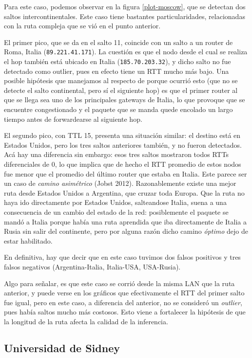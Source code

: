 Para este caso, podemos observar en la figura \ref{plot-moscow}, que se detectan dos saltos intercontinentales. Este caso tiene bastantes particularidades, relacionadas con la ruta compleja que se vió en el punto anterior. 

El primer pico, que se da en el salto 11, coincide con un salto a un router de Roma, Italia (\texttt{89.221.41.171}). La cuestión es que el nodo desde el cual se realiza el hop también está ubicado en Italia (\texttt{185.70.203.32}), y dicho salto no fue detectado como outlier, pues en efecto tiene un RTT mucho más bajo. Una posible hipótesis que manejamos al respecto de porque ocurrió esto (que no se detecte el salto continental, pero sí el siguiente hop) es que el primer router al que se llega sea uno de los principales gateways de Italia, lo que provoque que se encuentre congestionado y el paquete que se manda quede encolado un largo tiempo antes de forwardearse al siguiente hop. 

El segundo pico, con TTL 15, presenta una situación similar: el destino está en Estados Unidos, pero los tres saltos anteriores también, y no fueron detectados. Acá hay una diferencia sin embargo: esos tres saltos mostraron todos RTTs diferenciales de 0, lo que implica que de hecho el RTT promedio de estos nodos fue menor que el promedio del último router que estaba en Italia. Este parece ser un caso de \textit{camino asimétrico} (Jobst 2012). Razonablemente existe una mejor ruta desde Estados Unidos a Argentina, que cruzar toda Europa. Que la ruta no haya ido directamente por Estados Unidos, salteandose Italia, suena a una consecuencia de un cambio del estado de la red: posiblemente el paquete se mandó a Italia porque había una ruta aprendida que iba directamente de Italia a Rusia sin salir del continente, pero por alguna razón dicho camino \emph{óptimo} dejo de estar habilitado.

En definitiva, hay que decir que en este caso tuvimos dos falsos positivos y tres falsos negativos (Argentina-Italia, Italia-USA, USA-Rusia). 

Algo para señalar, es que este caso se corrió desde la misma LAN que la ruta anterior, y puede verse en los gráficos que efectivamente el RTT del primer salto fue igual, pero en este caso, a diferencia del anterior, no se consideró un \emph{outlier}, pues había saltos mucho más costosos. Esto viene a fortalecer la hipótesis de que la longitud de la ruta afecta la calidad de la inferencia.

\subsection*{Universidad de Sidney}

